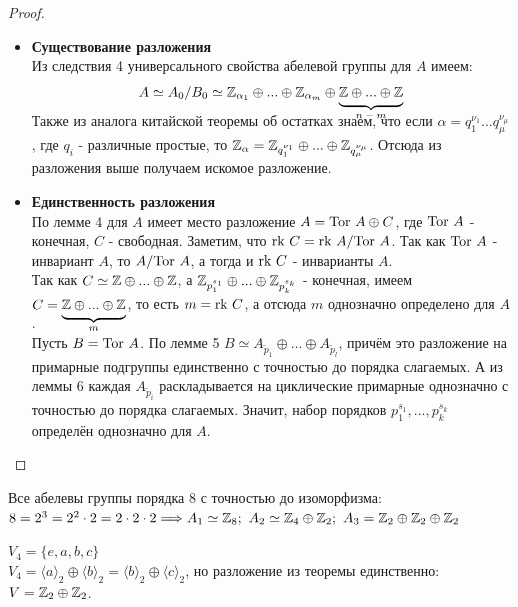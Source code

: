 \begin{proof}\tab
    \begin{itemize}
        \item \textbf{Существование разложения}\\
        Из следствия 4 универсального свойства абелевой группы для $A$ имеем:
        \[A \simeq A_0/B_0 \simeq \Z_{\alpha_1} \oplus ... \oplus \Z_{\alpha_m} \oplus \undermat{n-m}{\Z\oplus ... \oplus \Z}\]
        \newline
        Также из аналога китайской теоремы об остатках знаем, что если $\alpha = q_1^{\nu_1}...q_\mu^{\nu_\mu}$, где $q_i$ - различные простые, то $\mathbb{Z}_\alpha = \mathbb{Z}_{q_1^{\nu_1}} \oplus ... \oplus \mathbb{Z}_{q_\mu^{\nu_\mu}}$. Отсюда из разложения выше получаем искомое разложение.
        \item \textbf{Единственность разложения}\\
        По лемме 4 для $A$ имеет место разложение $A = \textup{Tor } A \oplus C$, где $\textup{Tor } A$ - конечная, $C$ - свободная. Заметим, что $\textup{rk } C = \textup{rk } A/\textup{Tor } A$. Так как $\textup{Tor } A$ - инвариант $A$, то $A/\textup{Tor } A$, а тогда и $\textup{rk } C$ - инварианты $A$.\\
        Так как $C \simeq \mathbb{Z} \oplus ... \oplus \mathbb{Z}$, а $\mathbb{Z}_{p_1^{s_1}} \oplus ... \oplus \mathbb{Z}_{p_k^{s_k}}$ - конечная, имеем $C = \undermat{m}{\Z \oplus ... \oplus \Z}$, то есть $m = \textup{rk } C$, а отсюда $m$ однозначно определено для $A$.\\
        Пусть $B = \textup{Tor } A$. По лемме 5 $B \simeq A_{\tilde{p}_1} \oplus ... \oplus A_{\tilde{p}_l}$, причём это разложение на примарные подгруппы единственно с точностью до порядка слагаемых. А из леммы 6 каждая $A_{\tilde{p}_i}$ раскладывается на циклические примарные однозначно с точностью до порядка слагаемых. Значит, набор порядков $p_1^{s_1},...,p_k^{s_k}$ определён однозначно для $A$.
    \end{itemize}
\end{proof}
\begin{example}
    Все абелевы группы порядка 8 с точностью до изоморфизма:\\
    $8 = 2^3 = 2^2 \cdot 2 = 2 \cdot 2 \cdot 2 \Longrightarrow A_1 \simeq \mathbb{Z}_8; \ A_2 \simeq \mathbb{Z}_4 \oplus \mathbb{Z}_2; \ A_3 = \mathbb{Z}_2 \oplus \mathbb{Z}_2 \oplus \mathbb{Z}_2$
\end{example}
\begin{example}
    $V_4 = \{e, a, b, c\}$\\
    $V_4 = \langle a \rangle_2 \oplus \langle b \rangle_2 = \langle b \rangle_2 \oplus \langle c \rangle_2$, но разложение из теоремы единственно: $V = \mathbb{Z}_2 \oplus \mathbb{Z}_2$.
\end{example}
